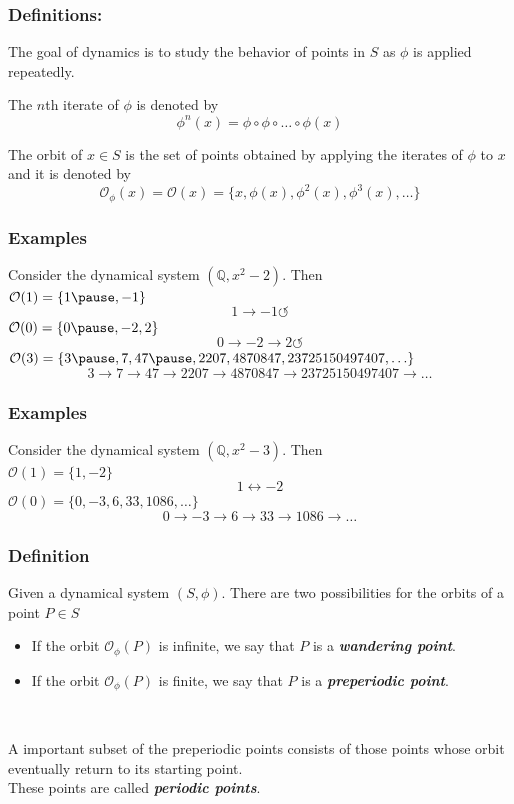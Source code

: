 \documentclass{beamer}
\def\jump{ \quad \\ \vspace{0.7cm} \pause}
\def\QQ{{\mathbb Q}}
\theoremstyle{thmstyle}
\theoremstyle{thmstyle}
\theoremstyle{thmstyle}
\theoremstyle{mystyle}
\theoremstyle{qstnstyle}
\begin{document}
\begin{frame}
\frametitle{Definitions:}
The goal of dynamics is to study the behavior of points in $S$ as $\phi$ is applied repeatedly. 

\pause\vspace{5mm}
The $n$th iterate of $\phi$ is denoted by $$\phi^n(x)=\phi \circ\phi \circ\ldots \circ\phi(x)$$

\pause\vspace{5mm}
The orbit of $x\in S$ is the set of points obtained by applying the iterates of $\phi$ to $x$ and it is denoted by 
$$\mathcal{O}_{\phi}(x)=\mathcal{O}(x)=\{x,\phi(x),\phi^2(x),\phi^3(x),\ldots \} $$


\end{frame}




\begin{frame}
\frametitle{Examples}
Consider the dynamical system $\displaystyle\left(\QQ,x^2-2\right)$. Then 
\jump
$\mathcal{O}(1)=\{1 \pause ,-1\} $
\pause
$$1 \longrightarrow -1 \circlearrowleft  $$
\pause
$\mathcal{O}(0)=\{0\pause,-2,2\} $
\pause
$$0 \longrightarrow -2 \longrightarrow 2 \circlearrowleft  $$
\pause
$\mathcal{O}(3)=\{3\pause,7,47\pause,2207,4870847,23725150497407,\ldots\} $
\pause
$$3\rightarrow 7\longrightarrow 47\longrightarrow  2207\longrightarrow 4870847\longrightarrow  23725150497407 \longrightarrow \ldots$$
\end{frame}

\begin{frame}
\frametitle{Examples}
Consider the dynamical system $\displaystyle\left(\QQ,x^2-3\right)$. Then 
\jump
$\mathcal{O}(1)=\{1,-2\} $
\pause
$$1 \longleftrightarrow -2  $$
\pause
$\mathcal{O}(0)=\{0,-3,6,33,1086,\ldots\} $
\pause
$$0 \longrightarrow -3 \longrightarrow 6 \longrightarrow 33 \longrightarrow 1086 \longrightarrow \ldots $$
\end{frame}

\begin{frame}
\frametitle{Definition}
Given a dynamical system $(S,\phi)$. There are two possibilities for the orbits of a point $P\in S$
\begin{itemize}
\item If the orbit $\mathcal{O}_{\phi}(P)$ is infinite, we say that $P$ is a \textbf{\textit{wandering point}}. 
\jump

\item If the orbit $\mathcal{O}_{\phi}(P)$ is finite, we say that $P$ is a \textbf{\textit{preperiodic point}}.
\end{itemize}
\jump

A important subset of the preperiodic points consists of those points whose orbit eventually return to its starting point. \\ These points are called \textbf{\textit{periodic points}}. 
\end{frame}
\end{document}
